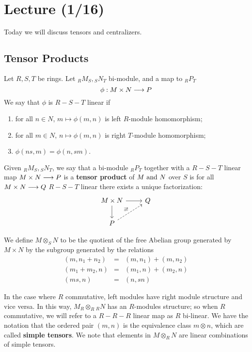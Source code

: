 \section{Lecture (1/16)}
Today we will discuss tensors and centralizers. 
\subsection{Tensor Products}
Let $R,S,T$ be rings. Let ${}_RM_S,{}_SN_T$ bi-module, and a map to ${}_RP_T$
$$\phi: M \times N \longrightarrow P$$
We say that $\phi$ is $R-S-T$ linear if
\begin{enumerate}
\item for all $n\in N$, $m\mapsto \phi (m,n)$ is left $R$-module homomorphism;
\item for all $m\in N$, $n\mapsto \phi (m,n)$ is right $T$-module homomorphism;
\item $\phi (ns,m) = \phi(n,sm)$.
\end{enumerate}
\begin{defn}\label{2.2}
Given ${}_RM_S,{}_SN_T$, we say that a bi-module ${}_RP_T$ together with a $R-S-T$ linear map $M\times N \longrightarrow P$ is a \textbf{tensor product} of $M \text{ and } N$ over $S$ is for all $M\times N \longrightarrow Q$ $R-S-T$ linear there exists a unique factorization:
$$
\begin{tikzcd}
M \times N \arrow{r} \arrow{d} & Q \\
P \arrow[dashed]{ru}{\exists !} & {}
\end{tikzcd}$$

\end{defn}
\begin{defn}\label{2.3}
We define $M \otimes_S N$ to be the quotient of the free Abelian group generated by $M \times N$ by the subgroup generated by the relations
\begin{eqnarray*}
(m,n_1 + n_2) & = & (m,n_1) + (m,n_2) \\
(m_1 + m_2,n) & = & (m_1,n) + (m_2,n) \\
(ms,n) & = & (n,sn)
\end{eqnarray*}
\end{defn}
In the case where $R$ commutative, left modules have right module structure and vice versa. In this way, $M_R \otimes_R {}_RN$ has an $R$-modules structure; so when $R$ commutative, we will refer to a $R-R-R$ linear map as $R$ bi-linear. We have the notation that the ordered pair $(m,n)$ is the equivalence class $m\otimes n$, which are called \textbf{simple tensors}. We note that elements in $M\otimes_R N$ are linear combinations of simple tensors.

